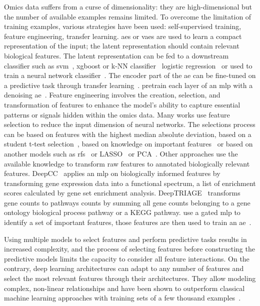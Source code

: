 \documentclass[../main.tex]{subfiles}
\begin{document}
	Omics data suffers from a curse of dimensionality: they are high-dimensional but the number of available examples remains limited.
	To overcome the limitation of training examples, various strategies have been used: self-supervised training, feature engineering, transfer learning.
	\Glspl{ae} or \glspl{vae} are used to learn a compact representation of the input; the latent representation should contain relevant biological features.
	The latent representation can be fed to a downstream classifier such as \gls{svm}~\cite{Zhang2020}, \gls{xgboost} or k-NN classifier~\cite{Arafa2023} logistic regression~\cite{Wang2018} or used to train a neural network classifier~\cite{Karim2019}.
	The encoder part of the \gls{ae} can be fine-tuned on a predictive task through transfer learning~\cite{Levy2020,Kaczmarek2022}.
	\citeauthor{Hanczar2018} pretrain each layer of an \gls{mlp} with a denoising \gls{ae}~\cite{Hanczar2018}.
	Feature engineering involves the creation, selection, and transformation of features to enhance the model's ability to capture essential patterns or signals hidden within the omics data.
	Many works use feature selection to reduce the input dimension of neural networks.
	The selections process can be based on features with the highest median absolute deviation, based on a student t-test selection~\cite{Liu2019}, based on knowledge on important features~\cite{Kaczmarek2022} or based on another models such as \glspl{rf}~\cite{Wojewodzic2021,Liu2019} or LASSO~\cite{Liu2019} or PCA~\cite{Yu2019}.
	Other approaches use the available knowledge to transform raw features to annotated biologically relevant features.
	DeepCC~\cite{gaoDeepCCNovelDeep2019} applies an \gls{mlp} on biologically informed features by transforming gene expression data into a functional spectrum, \ie{}a list of enrichment scores calculated by gene set enrichment analysis.
	DeepTRIAGE~\cite{beykikhoshkDeepTRIAGEInterpretableIndividualised2020a} transforms gene counts to pathways counts by summing all gene counts belonging to a gene ontology biological process pathway or a KEGG pathway.
	\citeauthor{Zhang2020} use a gated \gls{mlp} to identify a set of important features, those features are then used to train an \gls{ae}~\cite{Zhang2020}.

	Using multiple models to select features and perform predictive tasks results in increased complexity, and the process of selecting features before constructing the predictive models limits the capacity to consider all feature interactions.
	On the contrary, deep learning architectures can adapt to any number of features and select the most relevant features through their architectures.
	They allow modeling complex, non-linear relationships and have been shown to outperform classical machine learning approaches with training sets of a few thousand examples~\cite{Hanczar2022}.
\end{document}
